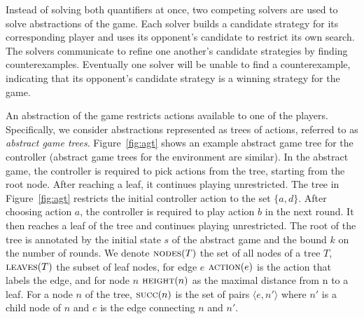 \documentclass{llncs}
\begin{document}
Instead of solving both quantifiers at once, two competing solvers are used to
solve abstractions of the game. Each solver builds a candidate strategy for its
corresponding player and uses its opponent's candidate to restrict its own
search. The solvers communicate to refine one another's candidate strategies by
finding counterexamples. Eventually one solver will be unable to find a
counterexample, indicating that its opponent's candidate strategy is a winning
strategy for the game.

An abstraction of the game restricts actions available to one of the players.
Specifically, we consider abstractions represented as trees of actions,
referred to as \emph{abstract game trees}.  Figure~\ref{fig:agt} shows an
example abstract game tree for the controller (abstract game trees for the
environment are similar).  In the abstract game, the controller is required to
pick actions from the tree, starting from the root node.  After reaching a
leaf, it continues playing unrestricted.  The tree in Figure~\ref{fig:agt}
restricts the initial controller action to the set $\{a, d\}$.  After choosing
action $a$, the controller is required to play action $b$ in the next round.
It then reaches a leaf of the tree and continues playing unrestricted.  The
root of the tree is annotated by the initial state $s$ of the abstract game and
the bound $k$ on the number of rounds.  We denote $\textsc{nodes}(T)$ the set
of all nodes of a tree $T$, $\textsc{leaves}(T)$ the subset of leaf nodes, for
edge $e$ $\textsc{action}(e)$ is the action that labels the edge, and for node
$n$ $\textsc{height}(n)$ as the maximal distance from n to a leaf. For a node
$n$ of the tree, $\textsc{succ}(n)$ is the set of pairs $\langle e, n' \rangle$
where $n'$ is a child node of $n$ and $e$ is the edge connecting $n$ and $n'$.
\end{document}
